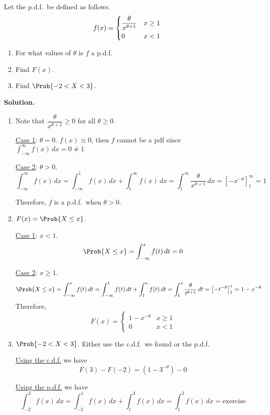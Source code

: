 \begin{Example}{}{}
    Let the p.d.f.\ be defined as follows.
    \[ f(x)=\begin{dcases}
            \frac{\theta}{x^{\theta+1}} & x\ge 1 \\
            0                           & x<1
        \end{dcases} \]
    \begin{enumerate}[label=(\roman*)]
        \item For what values of $ \theta $ is $ f $ a p.d.f.
        \item Find $ F(x) $.
        \item Find $ \Prob{-2<X<3} $.
    \end{enumerate}
    \textbf{Solution.}

    \begin{enumerate}[label=(\roman*)]
        \item Note that $ \dfrac{\theta}{x^{\theta+1}} \ge 0 $
              for all $ \theta\ge 0 $.

              \underline{Case 1}: $ \theta=0 $. $ f(x)\equiv 0 $, then $ f $
              cannot be a pdf since $ \int_{-\infty}^{\infty} f(x)\, d{x}=0\neq 1 $

              \underline{Case 2}: $ \theta>0 $.
              \[ \int_{-\infty}^{\infty} f(x)\, d{x}=\int_{-\infty}^{1} f(x)\, d{x}
                  +\int_{1}^{\infty} f(x)\, d{x}=\int_{1}^{\infty} \frac{\theta}{x^{\theta+1}}\, d{x}
                  =\left[ -x^{-\theta} \right]_1^\infty=1 \]

              Therefore, $ f $ is a p.d.f.\ when $ \theta>0 $.

        \item $ F(x)=\Prob{X\le x} $.

              \underline{Case 1}: $ x<1 $.
              \[ \Prob{X\le x}=\int_{-\infty}^{x} f(t)\, d{t} =0 \]

              \underline{Case 2}:  $ x\ge 1 $.
              \[ \Prob{X\le x}=\int_{-\infty}^{x} f(t)\, d{t}
                  =\int_{-\infty}^{1} f(t)\, d{t} +\int_{1}^{x} f(t)\, d{t}
                  =\int_{1}^{x} \frac{\theta}{t^{\theta+1}} \, d{t}=\left[ -t^{-\theta} \right]_1^x=
                  1-x^{-\theta}  \]
              Therefore,
              \[ F(x)=\begin{cases}
                      1-x^{-\theta} & x\ge 1 \\
                      0             & x< 1
                  \end{cases} \]
        \item $ \Prob{-2<X<3} $. Either use the c.d.f.\ we found or the p.d.f.

              \underline{Using the c.d.f.} we have
              \[ F(3)-F(-2)=(1-3^{-\theta})-0 \]

              \underline{Using the p.d.f.} we have
              \[ \int_{-2}^{3} f(x)\, d{x}=
                  \int_{-2}^{1} f(x)\, d{x} +\int_{1}^{3} f(x)\, d{x}
                  =\int_{1}^{3} f(x)\, d{x}=\text{exercise} \]
    \end{enumerate}

\end{Example}
